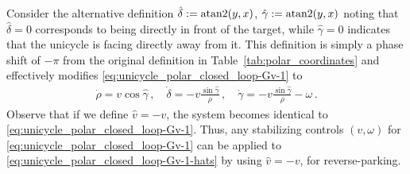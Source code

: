 \documentclass[journal,twoside,web]{ieeecolor}
\theoremstyle{definition}
\begin{document}
Consider the alternative definition $\hat{\delta} := {\rm atan2}(y, x)$, $\hat{\gamma} := {\rm atan2}(y, x)$
noting that $\hat{\delta} = 0$ corresponds to being directly in front of the target, while $\hat{\gamma} = 0$ indicates that the unicycle is facing directly away from it. 
This definition is simply a phase shift of $-\pi$ from the original definition in Table~\ref{tab:polar_coordinates} and effectively modifies \eqref{eq:unicycle_polar_closed_loop-Gv-1} to
\begin{align}
\label{eq:unicycle_polar_closed_loop-Gv-1-hats}
\dot{\rho} = 
v \cos\hat\gamma\,,\quad
\dot{\delta} =- v  \frac{\sin\hat\gamma}{\rho} 
\,,\quad
\dot{\gamma} = -v \frac{\sin\hat\gamma}{\rho} -\omega  \,.
\end{align} 
Observe that if we define $\hat{v} = -v$, the system becomes identical to 
\eqref{eq:unicycle_polar_closed_loop-Gv-1}.
Thus, any stabilizing controls $(v,\omega)$ for 
\eqref{eq:unicycle_polar_closed_loop-Gv-1}
can be applied to %
\eqref{eq:unicycle_polar_closed_loop-Gv-1-hats}
by using $\hat{v} = -v$, for reverse-parking.
\end{document}

